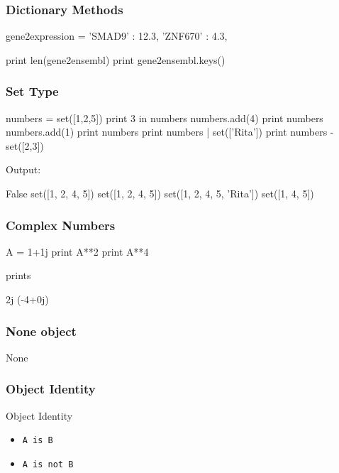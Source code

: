 \begin{frame}[fragile]
\frametitle{Dictionary Methods}

\begin{python}
gene2expression = {
    'SMAD9' : 12.3,
    'ZNF670' : 4.3,
}
    
print len(gene2ensembl)
print gene2ensembl.keys()
\end{python}


\end{frame}

\begin{frame}[fragile]
\frametitle{Set Type}
\begin{python}
numbers = set([1,2,5])
print 3 in numbers
numbers.add(4)
print numbers
numbers.add(1)
print numbers
print numbers | set(['Rita'])
print numbers - set([2,3])
\end{python}

Output:
\begin{python}
False
set([1, 2, 4, 5])
set([1, 2, 4, 5])
set([1, 2, 4, 5, 'Rita'])
set([1, 4, 5])
\end{python}

\end{frame}

\begin{frame}[fragile]
\frametitle{Complex Numbers}
\begin{python}
A = 1+1j
print A**2
print A**4
\end{python}

prints

\begin{python}
2j
(-4+0j)
\end{python}
\end{frame}


\begin{frame}[fragile]
\frametitle{None object}

\begin{python}
None
\end{python}
\end{frame}

\begin{frame}[fragile]
\frametitle{Object Identity}

\begin{block}{Object Identity}
\begin{itemize}
\item \lstinline{A is B}
\item \lstinline{A is not B}
\end{itemize}
\end{block}

\end{frame}

